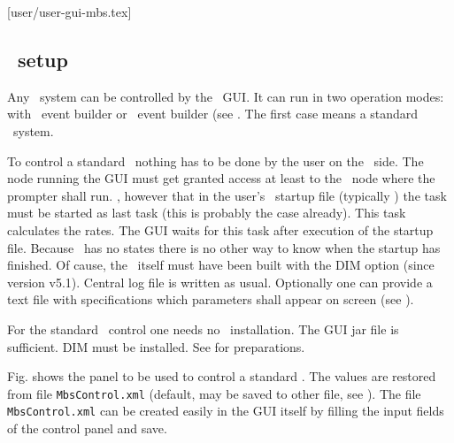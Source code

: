[user/user-gui-mbs.tex]
\label{user-gui-mbs-chapter}
\subsection[MBS setup]{\mbs\ setup}
Any \mbs\ system can be controlled by the \dabc\ GUI.
It can run in two operation modes: with \mbs\ event builder or \dabc\ event builder
(see .
The first case means a standard \mbs\ system.

To control a standard \mbs\ nothing has to be done by the user on the \mbs\ side.
The node running the GUI must get granted  access at least to the
\mbs\ node where the prompter shall run.
, however that in the user's \mbs\ startup file (typically ) the  task must be
started as last task (this is probably the case already).
This task calculates the rates. The GUI waits for this task after execution of
the startup file. Because \mbs\ has no states there is no other way to
know when the startup has finished.
Of cause, the \mbs\ itself must have been built with the DIM option (since version v5.1).
Central log file is written as usual.
Optionally one can provide a text file with specifications which parameters
shall appear on screen (see ).

For the standard \mbs\ control one needs no \dabc\ installation.
The GUI jar file is sufficient. DIM must be installed.
See  for preparations.

Fig.  shows the panel to be used to control
a standard \mbs.
The values are restored from file {\tt MbsControl.xml} (default, may be saved to other file,
see ).
The file {\tt MbsControl.xml} can be created easily in the GUI itself
by filling the input fields of the control panel and save.

